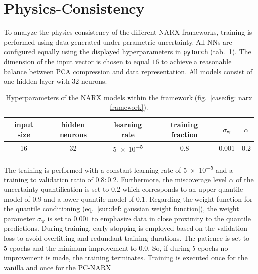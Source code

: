 
\section{Physics-Consistency}

To analyze the physics-consistency of the different NARX frameworks, training is performed using 
data generated under parametric uncertainty. All NNs are configured equally using the displayed
hyperparameters in \texttt{pyTorch} (tab.~\ref{results:tab:NARX-configuration}).
The dimension of the input vector is chosen to equal $16$ to achieve a reasonable balance between
PCA compression and data representation. All models consist of one hidden layer with $32$ neurons.
\begin{table}[!h]
    \caption[Hyperparameters of the NARX models within the framework.]{
        Hyperparameters of the NARX models within the framework (fig.~\ref{case:fig: narx framework}).
    }
    \centering
    \begin{tabular}{cccccc}
        \toprule
        input size & hidden neurons & learning rate & training fraction & $\sigma_\text{w}$ & $\alpha$ \\
        \midrule
        16 & 32 & \SI{5e-5}{} & 0.8 & 0.001 & 0.2 \\
    \bottomrule
    \end{tabular}
    \label{results:tab:NARX-configuration}
\end{table}
\newline
\newline
\noindent
The training is performed with a constant learning rate of \SI{5e-5}{} and a training to validation ratio of $0.8:0.2$.
Furthermore, the miscoverage level $\alpha$ of the uncertainty quantification is set to $0.2$ which
corresponds to an upper quantile model of $0.9$ and a lower quantile model of $0.1$.
Regarding the weight function for the quantile conditioning (eq.~\ref{sur:def: gaussian weight function}),
the weight parameter $\sigma_\text{w}$ is set to $0.001$ to emphasize data in close proximity to the
quantile predictions. During training, early-stopping is employed based on the validation loss to avoid overfitting 
and redundant training durations. The patience is set to $5$ epochs and the minimum improvement to $0.0$.
So, if during $5$ epochs no improvement is made, the training terminates.
Training is executed once for the vanilla and once for the PC-NARX
